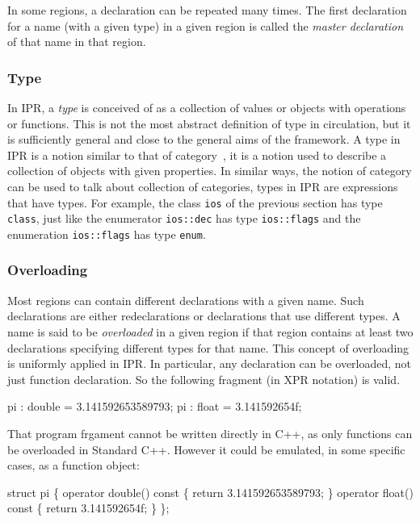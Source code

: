 \documentclass[letter,11pt]{article}
\begin{document}
In some regions, a declaration can be repeated many times. The first
 declaration for a name (with a given type) in a given region is 
 called the \emph{master declaration} of that name in that region.

\subsubsection{Type}
\label{sec:intro:general-notion:type}

In IPR, a \emph{type} is conceived of as a collection of values or objects
with operations or functions.  This is not the most abstract definition of
type in circulation, but it is sufficiently general and close to the 
general aims of the \ThePivot{} framework.  A type in IPR is a notion similar
to that of category~\cite{mac-lane01:categories}, it is a notion used to
describe a collection of objects with given properties.  In similar ways, the
notion of category can be used to talk about collection of categories, types 
in IPR are expressions that have types.  For example, the class \texttt{ios}
of the previous section has type \texttt{class}, just like
the enumerator \texttt{ios::dec} has type \texttt{ios::flags} and the
enumeration \texttt{ios::flags} has type \texttt{enum}.

\subsubsection{Overloading}
\label{sec:intro:general-notion:overloading}
Most regions can contain different declarations with a given name.  Such
declarations are either redeclarations or declarations that use
different types.  A name is said to be  \emph{overloaded} in a given region if
that region contains at least two declarations specifying different types for
that name.  This concept of overloading is uniformly applied in IPR.  In
particular, any declaration can be overloaded, not just function declaration.
So the following fragment (in XPR notation) is valid.
\begin{Program}
  pi : double = 3.141592653589793;
  pi : float = 3.141592654f;
\end{Program}

That program frgament cannot be written directly in C++, as only functions
can be overloaded in Standard C++.  However it could be emulated, in
some specific cases, as a function object:
\begin{Program}
  struct pi \{
    operator double() const \{ return 3.141592653589793; \}
    operator float() const \{ return 3.141592654f; \}
  \};
\end{Program}
\end{document}
